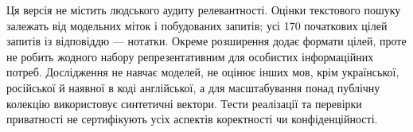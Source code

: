 Ця версія не містить людського аудиту релевантності. Оцінки текстового пошуку залежать від модельних міток і побудованих запитів; усі 170 початкових цілей запитів із відповіддю --- нотатки. Окреме розширення додає формати цілей, проте не робить жодного набору репрезентативним для особистих інформаційних потреб. Дослідження не навчає моделей, не оцінює інших мов, крім української, російської й наявної в коді англійської, а для масштабування понад публічну колекцію використовує синтетичні вектори. Тести реалізації та перевірки приватності не сертифікують усіх аспектів коректності чи конфіденційності.
